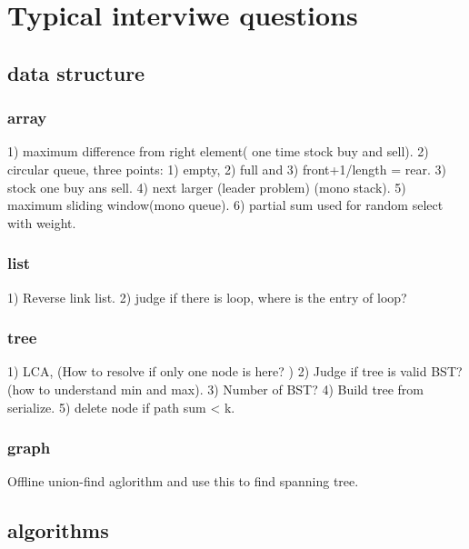\documentclass[a4paper,11pt,twoside]{book}
\begin{document}
\section{Typical interviwe questions}
\subsection{data structure}
\subsubsection{array}

\par 1) maximum difference from right element( one time stock buy and sell). 
2) circular queue, three points: 1) empty, 2) full and 3) front+1/length = rear. 		
3) stock one buy ans sell.
4) next larger (leader problem) (mono stack).
5) maximum sliding window(mono queue).
6) partial sum used for random select with weight. 

\subsubsection{list}

\par 1) Reverse link list. 2) judge if there is loop, where is the entry of loop? 

\subsubsection{tree}

\par 1) LCA, (How to resolve if only one node is here? )
2) Judge if tree is valid BST? (how to understand min and max). 
3) Number of BST?  
4) Build tree from serialize.
5) delete node if path sum < k.

\subsubsection{graph}

\par Offline union-find aglorithm and use this to find spanning tree.

\subsection{algorithms}
\end{document}
